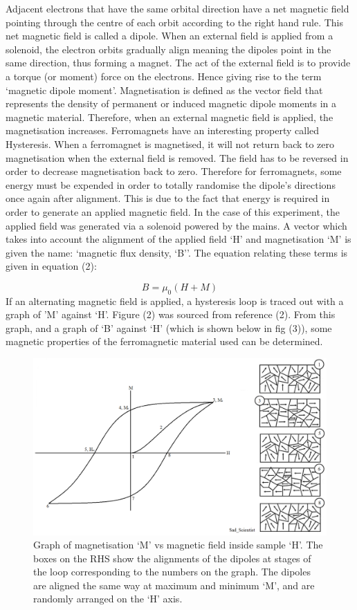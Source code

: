 \documentclass[a4paper]{article}\usepackage[english]{babel}
\begin{document}
Adjacent electrons that have the same orbital direction have a net magnetic field pointing through the centre of each orbit according to the right hand rule. This net magnetic field is called a dipole. When an external field is applied from a solenoid, the electron orbits gradually align meaning the dipoles point in the same direction, thus forming a magnet. The act of the external field is to provide a torque (or moment) force on the electrons. Hence giving rise to the term ‘magnetic dipole moment’.
Magnetisation is defined as the vector field that represents the density of permanent or induced magnetic dipole moments in a magnetic material. Therefore, when an external magnetic field is applied, the magnetisation increases.
Ferromagnets have an interesting property called Hysteresis. When a ferromagnet is magnetised, it will not return back to zero magnetisation when the external field is removed. The field has to be reversed in order to decrease magnetisation back to zero. Therefore for ferromagnets, some energy must be expended in order to totally randomise the dipole’s directions once again after alignment. This is due to the fact that energy is required in order to generate an applied magnetic field. In the case of this experiment, the applied field was generated via a solenoid powered by the mains.
A vector which takes into account the alignment of the applied field ‘H’ and magnetisation ‘M’ is given the name: ‘magnetic flux density, ‘B’’. The equation relating these terms is given in equation (2):

\begin{equation}\label{my_second_equation}
B= \mu_0(H+M)
\end{equation}
If an alternating magnetic field is applied, a hysteresis loop is traced out with a graph of 'M’ against ‘H’. Figure (2) was sourced from reference (2). From this graph, and a graph of ‘B’ against ‘H’ (which is shown below in fig (3)), some magnetic properties of the ferromagnetic material used can be determined.

\begin{figure}[!ht]
\includegraphics[width=\linewidth]{picture2.png}
\caption{\label{fig:picture2}Graph of magnetisation ‘M’ vs magnetic field inside sample ‘H’. The boxes on the RHS show the alignments of the dipoles at stages of the loop corresponding to the numbers on the graph. The dipoles are aligned the same way at maximum and minimum ‘M’, and are randomly arranged on the ‘H’ axis.}
\end{figure}
\end{document}
